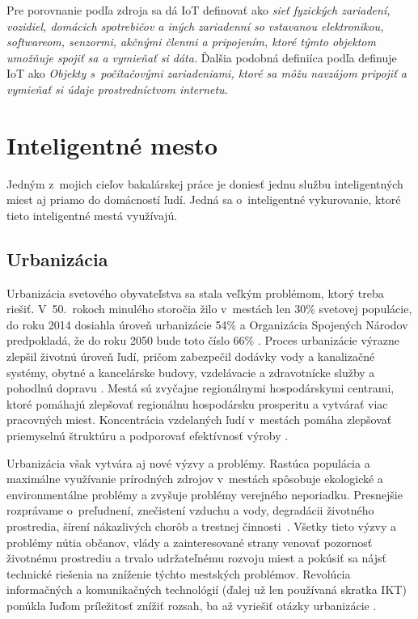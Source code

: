 Pre porovnanie podľa zdroja \cite{Shafiq2022} sa dá IoT definovať ako \emph{sieť fyzických zariadení, vozidiel, domácich spotrebičov a iných zariadenní so vstavanou elektronikou, softwareom, senzormi, akčnými členmi a pripojením, ktoré týmto objektom umožňuje spojiť sa a vymieňať si dáta.} 
Ďalšia podobná definiíca podľa \cite{cambridge} definuje IoT ako \emph{Objekty s~počítačovými zariadeniami, ktoré sa môžu navzájom pripojiť a vymieňať si údaje prostredníctvom internetu.}




\section{Inteligentné mesto}\label{iot-smartcity}
Jedným z~mojich cieľov bakalárskej práce je doniesť jednu službu inteligentných miest aj priamo do domácností ľudí. 
Jedná sa o~inteligentné vykurovanie, ktoré tieto inteligentné mestá využívajú.

\subsection{Urbanizácia}
Urbanizácia svetového obyvateľstva sa stala veľkým problémom, ktorý treba riešiť. 
V~50.~rokoch minulého storočia žilo v~mestách len 30\% svetovej populácie, do roku 2014 dosiahla úroveň urbanizácie 54\% a Organizácia Spojených Národov predpokladá, že do roku 2050 bude toto číslo 66\% \cite{gerland2014world}. 
Proces urbanizácie výrazne zlepšil životnú úroveň ľudí, pričom zabezpečil dodávky vody a kanalizačné systémy, obytné a kancelárske budovy, vzdelávacie a zdravotnícke služby a pohodlnú dopravu \cite{davis1965urbanization}. 
Mestá sú zvyčajne regionálnymi hospodárskymi centrami, ktoré pomáhajú zlepšovať regionálnu hospodársku prosperitu a vytvárať viac pracovných miest. 
Koncentrácia vzdelaných ľudí v~mestách pomáha zlepšovať priemyselnú štruktúru a podporovať efektívnosť výroby \cite{bertinelli2004urbanization}.

Urbanizácia však vytvára aj nové výzvy a problémy. 
Rastúca populácia a maximálne využívanie prírodných zdrojov v~mestách spôsobuje ekologické a environmentálne problémy a zvyšuje problémy verejného neporiadku. 
Presnejšie rozprávame o~preľudnení, znečistení vzduchu a vody, degradácii životného prostredia, šírení nákazlivých chorôb a trestnej činnosti~\cite{haughton1997developing}. 
Všetky tieto výzvy a problémy nútia občanov, vlády a zainteresované strany venovať pozornosť životnému prostrediu a trvalo udržateľnému rozvoju miest a pokúsiť sa nájsť technické riešenia na zníženie týchto mestských problémov.
Revolúcia informačných a komunikačných technológií (ďalej už len používaná skratka IKT) ponúkla ľuďom príležitosť znížiť rozsah, ba až vyriešiť otázky urbanizácie \cite{Yin2015}.

